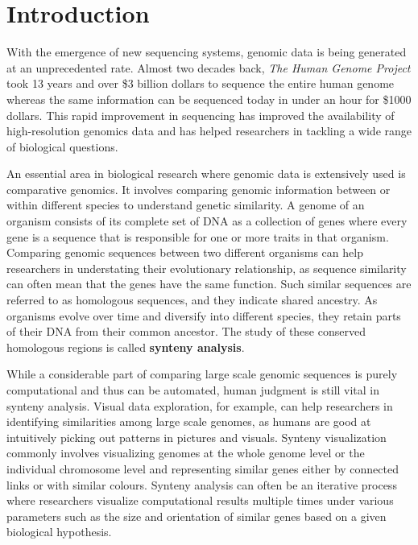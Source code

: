 \chapter{Introduction}

With the emergence of new sequencing systems, genomic data is being generated at an unprecedented rate. Almost two decades back, \textit{The Human Genome Project} took 13 years and over \$3 billion dollars to sequence the entire human genome whereas the same information can be sequenced today in under an hour for \$1000 dollars. This rapid improvement in sequencing has improved the availability of high-resolution genomics data and has helped researchers in tackling a wide range of biological questions.




An essential area in biological research where genomic data is extensively used is comparative genomics. It involves comparing genomic information between or within different species to understand genetic similarity. A genome of an organism consists of its complete set of DNA as a collection of genes where every gene is a sequence that is responsible for one or more traits in that organism. Comparing genomic sequences between two different organisms can help researchers in understating their evolutionary relationship, as sequence similarity can often mean that the genes have the same function. Such similar sequences are referred to as homologous sequences, and they indicate shared ancestry. As organisms evolve over time and diversify into different species, they retain parts of their DNA from their common ancestor. The study of these conserved homologous regions is called \textbf{synteny analysis}. 

While a considerable part of comparing large scale genomic sequences is purely computational and thus can be automated, human judgment is still vital in synteny analysis. Visual data exploration, for example, can help researchers in identifying similarities among large scale genomes, as humans are good at intuitively picking out patterns in pictures and visuals. Synteny visualization commonly involves visualizing genomes at the whole genome level or the individual chromosome level and representing similar genes either by connected links or with similar colours. Synteny analysis can often be an iterative process where researchers visualize computational results multiple times under various parameters such as the size and orientation of similar genes based on a given biological hypothesis.

